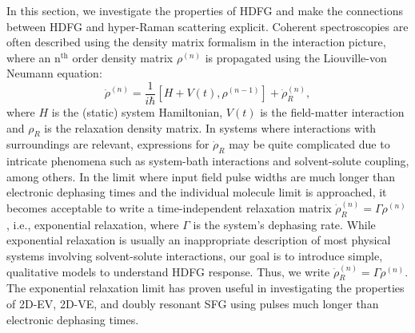 \documentclass[aip, jcp, reprint, onecolumn, nofootinbib]{revtex4-2}
\begin{document}
In this section, we investigate the properties of HDFG and make the connections between HDFG and hyper-Raman scattering explicit.
Coherent spectroscopies are often described using the density matrix formalism in the interaction picture, where an n$^{\text{th}}$ order density matrix $\rho^{(n)}$ is propagated using the Liouville-von Neumann equation:
\begin{equation}\label{LVNE}
	\dot{\rho}^{(n)} = \frac{1}{i \hbar} [H + V(t), \rho^{(n-1)}] + \dot{\rho}^{(n)}_R,
\end{equation}
where $H$ is the (static) system Hamiltonian, $V(t)$ is the field-matter interaction and $\rho_R$ is the relaxation density matrix. \cite{RN455}
In systems where interactions with surroundings are relevant, expressions for $\dot{\rho}_R$ may be quite complicated due to intricate phenomena such as system-bath interactions and solvent-solute coupling, among others. \cite{Sung2001}
In the limit where input field pulse widths are much longer than electronic dephasing times and the individual molecule limit is approached, it becomes acceptable to write a time-independent relaxation matrix $\dot{\rho}^{(n)}_R= \Gamma \rho^{(n)}$, i.e., exponential relaxation, where $\Gamma$ is the system's dephasing rate. \cite{RN455, Sue1986, Sung2001}
While exponential relaxation is usually an inappropriate description of most physical systems involving solvent-solute interactions,\cite{Sue1986, Yan1988, Li1994, Myers1997} our goal is to introduce simple, qualitative models to understand HDFG response.
Thus, we write $\dot{\rho}^{(n)}_R= \Gamma \rho^{(n)}$.
The exponential relaxation limit has proven useful in investigating the properties of 2D-EV, 2D-VE, and doubly resonant SFG using pulses much longer than electronic dephasing times. \cite{Raschke2002, Gaynor2017}
\end{document}
